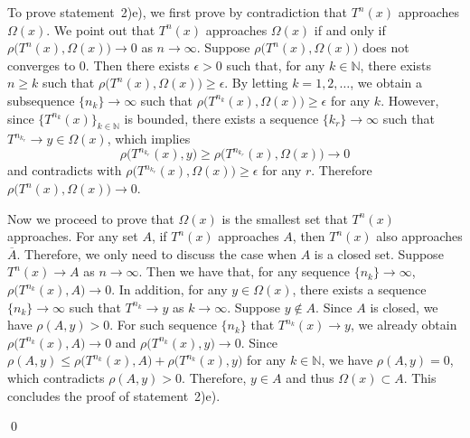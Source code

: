 \documentclass[10pt]{svmult}
\newcommand{\QED}{\begin{flushright}\qed \end{flushright}}
\begin{document}
To prove statement~2)e), we first prove by contradiction that $T^n(x)$ approaches $\Omega(x)$. We point out that $T^n (x)$ approaches $\Omega(x)$ if and only if $\rho\big( T^n(x),\Omega(x) \big)\to 0$ as $n\to \infty$. Suppose $\rho\big( T^n(x),\Omega(x) \big)$ does not converges to $0$. Then there exists $\epsilon>0$ such that, for any $k\in \mathbb{N}$, there exists $n\ge k$ such that $\rho\big( T^n(x),\Omega(x) \big)\ge \epsilon$. By letting $k=1,2,\dots$, we obtain a subsequence $\{n_k\}\to \infty$ such that $\rho\big( T^{n_k}(x),\Omega(x) \big)\ge \epsilon$ for any $k$. However, since $\{T^{n_k}(x)\}_{k\in \mathbb{N}}$ is bounded, there exists a sequence $\{k_r\}\to \infty$ such that $T^{n_{k_r}}\to y\in \Omega(x)$, which implies 
\begin{equation*}
\rho\big( T^{n_{k_r}}(x),y \big) \ge \rho\big( T^{n_{k_r}}(x),\Omega(x) \big) \to 0
\end{equation*} 
and contradicts with $\rho\big( T^{n_{k_r}}(x),\Omega(x) \big)\ge \epsilon$ for any $r$. Therefore $\rho\big( T^n(x),\Omega(x) \big)\to 0$.

Now we proceed to prove that $\Omega(x)$ is the smallest set that $T^n(x)$ approaches. For any set $A$, if $T^n(x)$ approaches $A$, then $T^n(x)$ also approaches $\overline{A}$. Therefore, we only need to discuss the case when $A$ is a closed set. Suppose $T^n(x)\to A$ as $n\to \infty$. Then we have that, for any sequence $\{n_k\}\to \infty$, $\rho\big( T^{n_k}(x),A \big)\to 0$. In addition, for any $y\in \Omega(x)$, there exists a sequence $\{n_k\}\to \infty$ such that $T^{n_k}\to y$ as $k\to \infty$. Suppose $y\notin A$. Since $A$ is closed, we have $\rho(A,y)>0$. For such sequence $\{n_k\}$ that $T^{n_k}(x)\to y$, we already obtain $\rho\big( T^{n_k}(x),A \big)\to 0$ and $\rho\big( T^{n_k}(x),y \big)\to 0$. Since $\rho(A,y)\le \rho\big( T^{n_k}(x),A \big) + \rho\big( T^{n_k}(x),y \big)$ for any $k\in \mathbb{N}$, we have $\rho(A,y)=0$, which contradicts $\rho(A,y)>0$. Therefore, $y\in A$ and thus $\Omega(x)\subset A$. This concludes the proof of statement~2)e).\QED 
\end{document}
